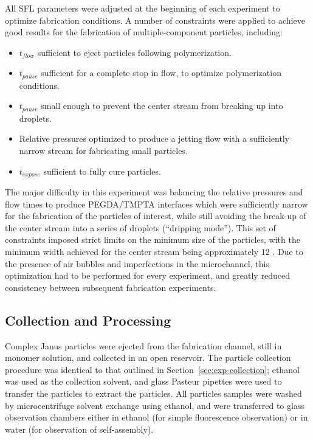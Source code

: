 All SFL parameters were adjusted at the beginning of each experiment to optimize fabrication 
conditions.  A number of constraints were applied to achieve good results for 
the fabrication of multiple-component particles, including:

\begin{itemize}
\item $t_{flow}$ sufficient to eject particles following polymerization.
\item $t_{pause}$ sufficient for a complete stop in flow, to optimize polymerization conditions.
\item $t_{pause}$ small enough to prevent the center stream from breaking up into droplets.
\item Relative pressures optimized to produce a jetting flow with a sufficiently narrow stream
for fabricating small particles.
\item $t_{expose}$ sufficient to fully cure particles.
\end{itemize}

The major difficulty in this experiment was balancing the relative pressures and flow times to produce
PEGDA/TMPTA interfaces which were sufficiently narrow for the fabrication of the particles of interest,
while still avoiding the break-up of the center stream into a series of droplets (``dripping mode'').
This set of constraints imposed strict limits on the minimum size of the particles, with
the minimum width achieved for the center stream being approximately 12 \microns.
Due to the presence of air bubbles and imperfections in the microchannel, this optimization had to be
performed for every experiment, and greatly reduced consistency between subsequent fabrication experiments.

\subsection{Collection and Processing}

Complex Janus particles were ejected from the fabrication channel, still in monomer solution, and collected
in an open reservoir.  The particle collection procedure was identical to that outlined in 
Section~\ref{sec:exp-collection}; ethanol was used as the collection solvent, and glass Pasteur
pipettes were used to transfer the particles to extract the particles.  All particles samples
were washed by microcentrifuge solvent exchange using ethanol, and were transferred to 
glass observation
chambers either in ethanol (for simple fluorescence observation) or in water (for
observation of self-assembly).


